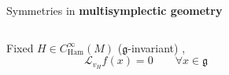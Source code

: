 \documentclass[handout,10pt]{beamer}
\begin{document}
\begin{frame}[t]{Symmetries in \textbf{multisymplectic geometry}}
\begin{columns}[T]
\begin{column}{.50\linewidth}
{\begin{propblock}
                  \small Fixed $H\in C^\infty_{\text{Ham}}(M)$ ($\mathfrak{g}$-invariant) ,
                  $$\mathcal{L}_{v_H} f(x) = 0 \qquad \forall x \in \mathfrak{g}$$
                \end{propblock}
    }
              \end{column}
              \begin{column}{.50\linewidth}
                \centering \it
              \end{column}
            \end{columns}
          \end{frame}
    \note{
    }
    
\end{document}
